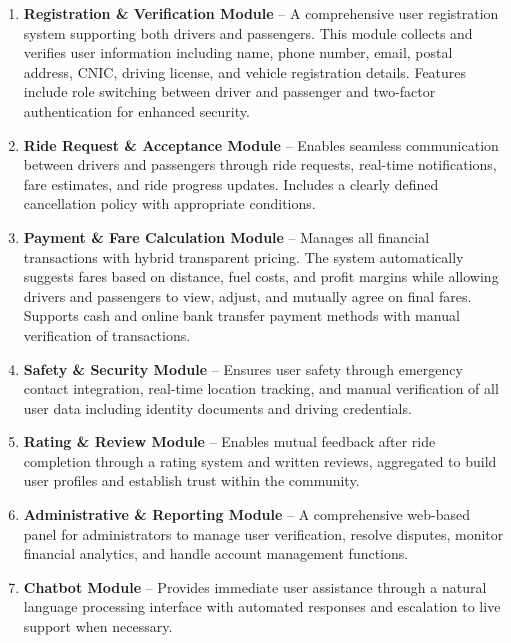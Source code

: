 \begin{enumerate}
    \item \textbf{Registration \& Verification Module} – A comprehensive user registration system supporting both drivers and passengers. This module collects and verifies user information including name, phone number, email, postal address, CNIC, driving license, and vehicle registration details. Features include role switching between driver and passenger and two-factor authentication for enhanced security.
    
    \item \textbf{Ride Request \& Acceptance Module} – Enables seamless communication between drivers and passengers through ride requests, real-time notifications, fare estimates, and ride progress updates. Includes a clearly defined cancellation policy with appropriate conditions.
    
    \item \textbf{Payment \& Fare Calculation Module} – Manages all financial transactions with hybrid transparent pricing. The system automatically suggests fares based on distance, fuel costs, and profit margins while allowing drivers and passengers to view, adjust, and mutually agree on final fares. Supports cash and online bank transfer payment methods with manual verification of transactions.
    
    \item \textbf{Safety \& Security Module} – Ensures user safety through emergency contact integration, real-time location tracking, and manual verification of all user data including identity documents and driving credentials.
    
    \item \textbf{Rating \& Review Module} – Enables mutual feedback after ride completion through a rating system and written reviews, aggregated to build user profiles and establish trust within the community.
    
    \item \textbf{Administrative \& Reporting Module} – A comprehensive web-based panel for administrators to manage user verification, resolve disputes, monitor financial analytics, and handle account management functions.
    
    \item \textbf{Chatbot Module} – Provides immediate user assistance through a natural language processing interface with automated responses and escalation to live support when necessary.
    

\end{enumerate}
